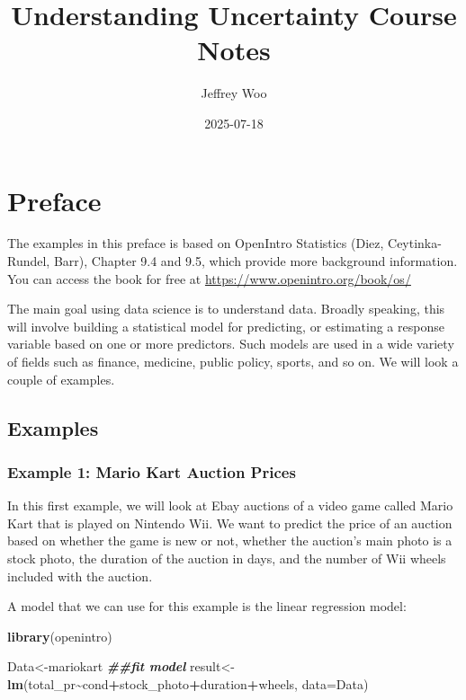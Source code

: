 \documentclass[
]{book}
\title{Understanding Uncertainty Course Notes}
\author{Jeffrey Woo}
\date{2025-07-18}
\newenvironment{Shaded}{\begin{snugshade}}{\end{snugshade}}
\newcommand{\AttributeTok}[1]{\textcolor[rgb]{0.13,0.29,0.53}{#1}}
\newcommand{\DocumentationTok}[1]{\textcolor[rgb]{0.56,0.35,0.01}{\textbf{\textit{#1}}}}
\newcommand{\FunctionTok}[1]{\textcolor[rgb]{0.13,0.29,0.53}{\textbf{#1}}}
\newcommand{\NormalTok}[1]{#1}
\newcommand{\OtherTok}[1]{\textcolor[rgb]{0.56,0.35,0.01}{#1}}
\newcommand{\SpecialCharTok}[1]{\textcolor[rgb]{0.81,0.36,0.00}{\textbf{#1}}}
\begin{document}
\maketitle

{
\setcounter{tocdepth}{1}
\tableofcontents
}
\chapter*{Preface}\label{preface}

The examples in this preface is based on OpenIntro Statistics (Diez, Ceytinka-Rundel, Barr), Chapter 9.4 and 9.5, which provide more background information. You can access the book for free at \url{https://www.openintro.org/book/os/}

The main goal using data science is to understand data. Broadly speaking, this will involve building a statistical model for predicting, or estimating a response variable based on one or more predictors. Such models are used in a wide variety of fields such as finance, medicine, public policy, sports, and so on. We will look a couple of examples.

\section{Examples}\label{examples}

\subsection{Example 1: Mario Kart Auction Prices}\label{example-1-mario-kart-auction-prices}

In this first example, we will look at Ebay auctions of a video game called Mario Kart that is played on Nintendo Wii. We want to predict the price of an auction based on whether the game is new or not, whether the auction's main photo is a stock photo, the duration of the auction in days, and the number of Wii wheels included with the auction.

A model that we can use for this example is the linear regression model:

\begin{Shaded}
\begin{Highlighting}[]
\FunctionTok{library}\NormalTok{(openintro)}

\NormalTok{Data}\OtherTok{\textless{}{-}}\NormalTok{mariokart}
\DocumentationTok{\#\#fit model}
\NormalTok{result}\OtherTok{\textless{}{-}}\FunctionTok{lm}\NormalTok{(total\_pr}\SpecialCharTok{\textasciitilde{}}\NormalTok{cond}\SpecialCharTok{+}\NormalTok{stock\_photo}\SpecialCharTok{+}\NormalTok{duration}\SpecialCharTok{+}\NormalTok{wheels, }\AttributeTok{data=}\NormalTok{Data)}
\end{Highlighting}
\end{Shaded}
\end{document}
